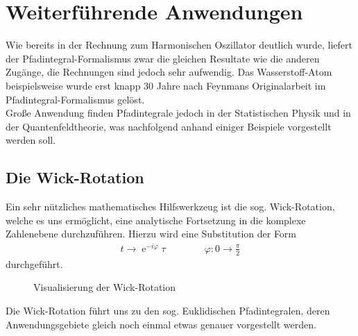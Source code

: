 \section{Weiterführende Anwendungen}
Wie bereits in der Rechnung zum Harmonischen Oszillator deutlich wurde, liefert der Pfadintegral-Formalismus zwar die gleichen Resultate wie die anderen Zugänge, die Rechnungen sind jedoch sehr aufwendig. Das Wasserstoff-Atom beispielsweise wurde erst knapp 30 Jahre nach Feynmans Originalarbeit im Pfadintegral-Formalismus gelöst. \\
Große Anwendung finden Pfadintegrale jedoch in der Statistischen Physik und in der Quantenfeldtheorie, was nachfolgend anhand einiger Beispiele vorgestellt werden soll.
\subsection{Die Wick-Rotation}
Ein sehr nützliches mathematisches Hilfswerkzeug  ist die sog. Wick-Rotation, welche  es uns ermöglicht, eine analytische Fortsetzung in die komplexe Zahlenebene durchzuführen. Hierzu wird eine Substitution der Form
\begin{align}
	t \longrightarrow \operatorname{e}^{-i\varphi}\tau \qquad\qquad \varphi: 0 \rightarrow \frac{\pi}{2}
\end{align}
durchgeführt. 

\begin{figure}[H]
\centering
{}
\caption{Visualisierung der Wick-Rotation}
\end{figure} 	
Die Wick-Rotation führt uns zu den sog. Euklidischen Pfadintegralen, deren Anwendungsgebiete gleich noch einmal etwas genauer vorgestellt werden.

